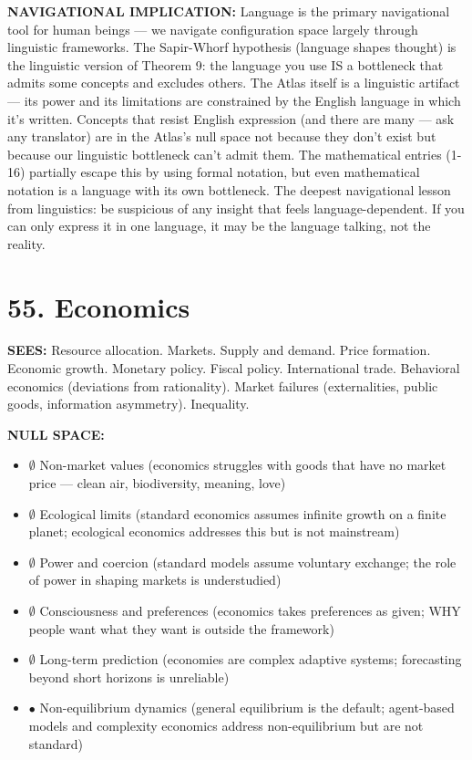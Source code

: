\textbf{NAVIGATIONAL IMPLICATION:} Language is the primary navigational tool for human beings — we navigate configuration space largely through linguistic frameworks. The Sapir-Whorf hypothesis (language shapes thought) is the linguistic version of Theorem 9: the language you use IS a bottleneck that admits some concepts and excludes others. The Atlas itself is a linguistic artifact — its power and its limitations are constrained by the English language in which it's written. Concepts that resist English expression (and there are many — ask any translator) are in the Atlas's null space not because they don't exist but because our linguistic bottleneck can't admit them. The mathematical entries (1-16) partially escape this by using formal notation, but even mathematical notation is a language with its own bottleneck. The deepest navigational lesson from linguistics: be suspicious of any insight that feels language-dependent. If you can only express it in one language, it may be the language talking, not the reality.


\bigskip\noindent\makebox[\textwidth]{\color{rulegray}\rule{5cm}{0.3pt}}\bigskip


\section*{55. Economics}


\textbf{SEES:} Resource allocation. Markets. Supply and demand. Price formation. Economic growth. Monetary policy. Fiscal policy. International trade. Behavioral economics (deviations from rationality). Market failures (externalities, public goods, information asymmetry). Inequality.


\textbf{NULL SPACE:}

\begin{itemize}[nosep,leftmargin=*]
  \item $\emptyset$ Non-market values (economics struggles with goods that have no market price — clean air, biodiversity, meaning, love)
  \item $\emptyset$ Ecological limits (standard economics assumes infinite growth on a finite planet; ecological economics addresses this but is not mainstream)
  \item $\emptyset$ Power and coercion (standard models assume voluntary exchange; the role of power in shaping markets is understudied)
  \item $\emptyset$ Consciousness and preferences (economics takes preferences as given; WHY people want what they want is outside the framework)
  \item $\emptyset$ Long-term prediction (economies are complex adaptive systems; forecasting beyond short horizons is unreliable)
  \item $\bullet$ Non-equilibrium dynamics (general equilibrium is the default; agent-based models and complexity economics address non-equilibrium but are not standard)
\end{itemize}


